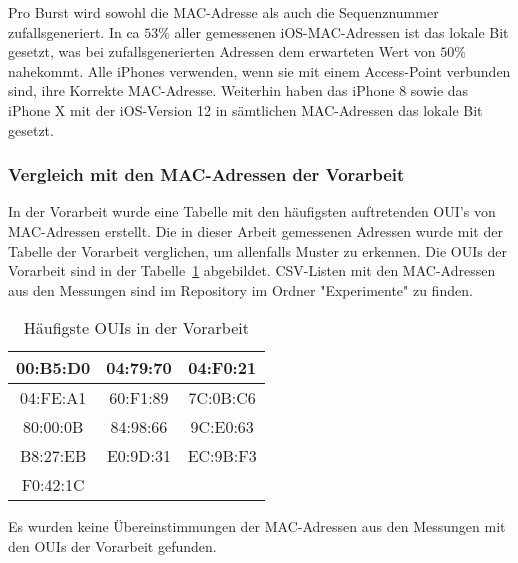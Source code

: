 Pro Burst wird sowohl die MAC-Adresse als auch die Sequenznummer zufallsgeneriert.
In ca $53\%$ aller gemessenen iOS-MAC-Adressen ist das lokale Bit gesetzt, was bei 
zufallsgenerierten Adressen dem erwarteten Wert von $50\%$ nahekommt.
Alle iPhones verwenden, wenn sie mit einem Access-Point verbunden sind, ihre 
Korrekte MAC-Adresse. Weiterhin haben das iPhone 8 sowie das iPhone X mit der 
iOS-Version 12 in sämtlichen MAC-Adressen das lokale Bit gesetzt.

\subsubsection*{Vergleich mit den MAC-Adressen der Vorarbeit}
In der Vorarbeit wurde eine Tabelle mit den häufigsten auftretenden OUI's von
MAC-Adressen erstellt. Die in dieser Arbeit gemessenen Adressen wurde mit der
Tabelle der Vorarbeit verglichen, um allenfalls Muster zu erkennen. 
Die OUIs der Vorarbeit sind in der Tabelle~\ref{table:commonouis} abgebildet.
CSV-Listen mit den MAC-Adressen aus den Messungen sind im Repository im 
Ordner "Experimente" zu finden.

\begin{table}[h!]
    \centering
    \begin{tabular}{|c|c|c|}
        \hline
        00:B5:D0 & 04:79:70 & 04:F0:21 \\
        \hline
        04:FE:A1 & 60:F1:89 & 7C:0B:C6 \\
        \hline 
        80:00:0B & 84:98:66 & 9C:E0:63 \\
        \hline 
        B8:27:EB & E0:9D:31 & EC:9B:F3 \\
        \hline
        F0:42:1C & & \\
        \hline 
    \end{tabular}
    \caption{Häufigste OUIs in der Vorarbeit
    \label{table:commonouis}}  
\end{table}

Es wurden keine Übereinstimmungen der MAC-Adressen aus den Messungen mit den 
OUIs der Vorarbeit gefunden.
\clearpage